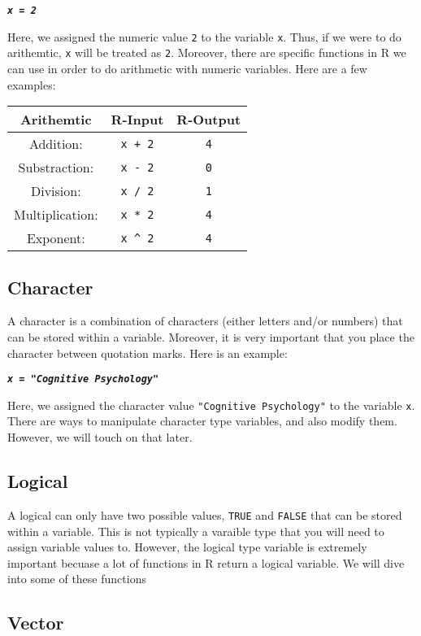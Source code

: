 \documentclass[]{book}
\begin{document}
\textbf{\emph{\texttt{x\ =\ 2}}}

Here, we assigned the numeric value \texttt{2} to the variable
\texttt{x}. Thus, if we were to do arithemtic, \texttt{x} will be
treated as \texttt{2}. Moreover, there are specific functions in R we
can use in order to do arithmetic with numeric variables. Here are a few
examples:

\begin{longtable}[]{@{}ccc@{}}
\toprule
Arithemtic & R-Input & R-Output\tabularnewline
\midrule
\endhead
Addition: & \texttt{x\ +\ 2} & \texttt{4}\tabularnewline
Substraction: & \texttt{x\ -\ 2} & \texttt{0}\tabularnewline
Division: & \texttt{x\ /\ 2} & \texttt{1}\tabularnewline
Multiplication: & \texttt{x\ *\ 2} & \texttt{4}\tabularnewline
Exponent: & \texttt{x\ \^{}\ 2} & \texttt{4}\tabularnewline
\bottomrule
\end{longtable}

\subsection{Character}\label{character}

A character is a combination of characters (either letters and/or
numbers) that can be stored within a variable. Moreover, it is very
important that you place the character between quotation marks. Here is
an example:

\textbf{\emph{\texttt{x\ =\ "Cognitive\ Psychology"}}}

Here, we assigned the character value \texttt{"Cognitive\ Psychology"}
to the variable \texttt{x}. There are ways to manipulate character type
variables, and also modify them. However, we will touch on that later.

\subsection{Logical}\label{logical}

A logical can only have two possible values, \texttt{TRUE} and
\texttt{FALSE} that can be stored within a variable. This is not
typically a varaible type that you will need to assign variable values
to. However, the logical type variable is extremely important becuase a
lot of functions in R return a logical variable. We will dive into some
of these functions

\subsection{Vector}\label{vector}
\end{document}
